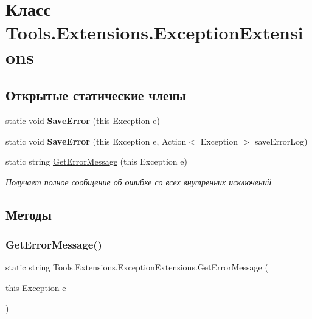 \hypertarget{class_tools_1_1_extensions_1_1_exception_extensions}{}\section{Класс Tools.\+Extensions.\+Exception\+Extensions}
\label{class_tools_1_1_extensions_1_1_exception_extensions}
\subsection*{Открытые статические члены}
\begin{DoxyCompactItemize}
\item 
\mbox{\label{class_tools_1_1_extensions_1_1_exception_extensions_aa5de3c66c34a89df931c2403fda9d355}} 
static void {\bfseries Save\+Error} (this Exception e)
\item 
\mbox{\label{class_tools_1_1_extensions_1_1_exception_extensions_adbf4df39114a01f6504295feccc6646c}} 
static void {\bfseries Save\+Error} (this Exception e, Action$<$ Exception $>$ save\+Error\+Log)
\item 
static string \hyperlink{class_tools_1_1_extensions_1_1_exception_extensions_ade95423b5dcf88ea7c1f885f839a9e8c}{Get\+Error\+Message} (this Exception e)
\begin{DoxyCompactList}\small\item\em Получает полное сообщение об ошибке со всех внутренних исключений \end{DoxyCompactList}\end{DoxyCompactItemize}


\subsection{Методы}
\mbox{\label{class_tools_1_1_extensions_1_1_exception_extensions_ade95423b5dcf88ea7c1f885f839a9e8c}} 
\subsubsection{\texorpdfstring{Get\+Error\+Message()}{GetErrorMessage()}}
{\footnotesize\ttfamily static string Tools.\+Extensions.\+Exception\+Extensions.\+Get\+Error\+Message (\begin{DoxyParamCaption}\item[{this Exception}]{e }\end{DoxyParamCaption})\hspace{0.3cm}{\ttfamily [static]}}



